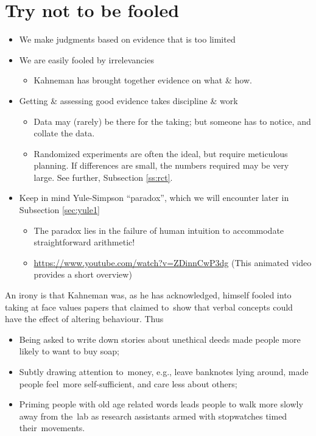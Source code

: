 \documentclass[
  10pt,
  b5paper]{book}
\providecommand{\tightlist}{%
  \setlength{\itemsep}{0pt}\setlength{\parskip}{0pt}}
\begin{document}
\hypertarget{try-not-to-be-fooled}{%
\section{Try not to be fooled}\label{try-not-to-be-fooled}}

\begin{itemize}
\tightlist
\item
  We make judgments based on evidence that is too limited
\item
  We are easily fooled by irrelevancies

  \begin{itemize}
  \tightlist
  \item
    Kahneman has brought together evidence on what \& how.
  \end{itemize}
\item
  Getting \& assessing good evidence takes discipline \& work

  \begin{itemize}
  \tightlist
  \item
    Data may (rarely) be there for the taking;
    but someone has to notice, and collate the data.
  \item
    Randomized experiments are often the ideal, but require
    meticulous planning. If differences are small, the numbers
    required may be very large. See further, Subsection \ref{ss:rct}.
  \end{itemize}
\item
  Keep in mind Yule-Simpson ``paradox'', which we will encounter
  later in Subsection \ref{sec:yule1}

  \begin{itemize}
  \tightlist
  \item
    The paradox lies in the failure of human intuition to
    accommodate straightforward arithmetic!
  \item
    \url{https://www.youtube.com/watch?v=ZDinnCwP3dg}
    (This animated video provides a short overview)
  \end{itemize}
\end{itemize}

An irony is that Kahneman was, as he has acknowledged,
himself fooled into taking at face values papers that
claimed to~show that verbal concepts could have the
effect of altering behaviour. Thus

\begin{itemize}
\tightlist
\item
  Being asked to write down stories about unethical deeds
  made people more likely to want to buy soap;
\item
  Subtly drawing attention to~money, e.g., leave banknotes
  lying around, made people feel~more self-sufficient, and
  care less about others;
\item
  Priming people with old age related words leads people to
  walk more slowly away from the~lab as research
  assistants armed with stopwatches timed their~movements.
\end{itemize}
\end{document}
